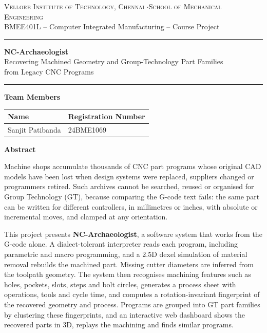\documentclass[11pt,a4paper]{article}
\begin{document}
\begin{center}
{\small\scshape Vellore Institute of Technology, Chennai \quad$\cdot$\quad School of Mechanical Engineering}\\[2pt]
{\small BMEE401L \;--\; Computer Integrated Manufacturing \;--\; Course Project}

\vspace{14pt}
{\color{rule}\rule{\linewidth}{0.6pt}}
\vspace{6pt}

{\LARGE\bfseries NC-Archaeologist}\\[6pt]
{\large Recovering Machined Geometry and Group-Technology Part Families\\[2pt] from Legacy CNC Programs}

\vspace{6pt}
{\color{rule}\rule{\linewidth}{0.6pt}}
\end{center}

\vspace{4pt}
\textbf{\large Team Members}

\begin{tabular}{@{}>{\raggedright}p{6.5cm}l@{}}
\toprule
\textbf{Name} & \textbf{Registration Number} \\
\midrule
Sanjit Patibanda & 24BME1069 \\
\bottomrule
\end{tabular}

\vspace{10pt}
\textbf{\large Abstract}

Machine shops accumulate thousands of CNC part programs whose original CAD models have been lost when design systems were replaced, suppliers changed or programmers retired. Such archives cannot be searched, reused or organised for Group Technology (GT), because comparing the G-code text fails: the same part can be written for different controllers, in millimetres or inches, with absolute or incremental moves, and clamped at any orientation.

This project presents \textbf{NC-Archaeologist}, a software system that works from the G-code alone. A dialect-tolerant interpreter reads each program, including parametric and macro programming, and a 2.5D dexel simulation of material removal rebuilds the machined part. Missing cutter diameters are inferred from the toolpath geometry. The system then recognises machining features such as holes, pockets, slots, steps and bolt circles, generates a process sheet with operations, tools and cycle time, and computes a rotation-invariant fingerprint of the recovered geometry and process. Programs are grouped into GT part families by clustering these fingerprints, and an interactive web dashboard shows the recovered parts in 3D, replays the machining and finds similar programs.
\end{document}
